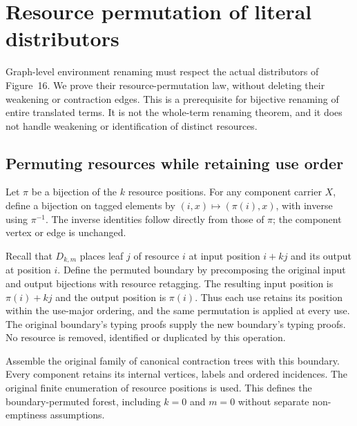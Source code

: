 \clearpage
\section{Resource permutation of literal distributors}
\label{sec:copying-distributor-permutation}
Graph-level environment renaming must respect the actual distributors of
Figure~16. We prove their resource-permutation law, without deleting their
weakening or contraction edges. This is a prerequisite for bijective renaming
of entire translated terms. It is not the whole-term renaming theorem, and
it does not handle weakening or identification of distinct resources.

\subsection{Permuting resources while retaining use order}
Let $\pi$ be a bijection of the $k$ resource positions. For any component
carrier $X$, define a bijection on tagged elements by
$(i,x)\mapsto(\pi(i),x)$, with inverse using $\pi^{-1}$.
The inverse identities follow directly from those of $\pi$; the component
vertex or edge is unchanged.

Recall that $D_{k,m}$ places leaf $j$ of resource $i$ at input position
$i+kj$ and its output at position $i$. Define the permuted boundary by
precomposing the original input and output bijections with resource retagging.
The resulting input position is $\pi(i)+kj$ and the output position is
$\pi(i)$. Thus each use retains its position within the use-major ordering,
and the same permutation is applied at every use. The original boundary's
typing proofs supply the new boundary's typing proofs. No resource is removed,
identified or duplicated by this operation.

Assemble the original family of canonical contraction trees with this
boundary. Every component retains its internal vertices, labels and ordered
incidences. The original finite enumeration of resource positions is used.
This defines the boundary-permuted forest, including $k=0$ and $m=0$ without
separate non-emptiness assumptions.

